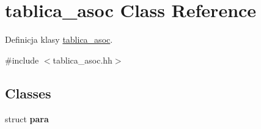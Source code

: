 \hypertarget{classtablica__asoc}{\section{tablica\-\_\-asoc \-Class \-Reference}
\label{classtablica__asoc}
}


\-Definicja klasy \hyperlink{classtablica__asoc}{tablica\-\_\-asoc}.  




{\ttfamily \#include $<$tablica\-\_\-asoc.\-hh$>$}

\subsection*{\-Classes}
\begin{DoxyCompactItemize}
\item 
struct {\bfseries para}
\end{DoxyCompactItemize}
